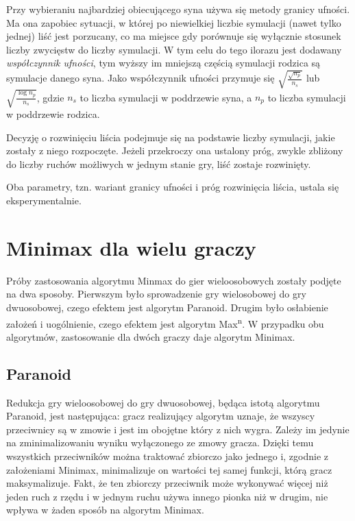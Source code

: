 \documentclass{pracamgr}
\begin{document}
Przy wybieraniu najbardziej obiecującego syna używa się metody granicy ufności.
Ma ona zapobiec sytuacji, w której po niewielkiej liczbie symulacji (nawet tylko jednej) liść jest porzucany, co ma miejsce gdy porównuje się wyłącznie stosunek liczby zwycięstw do liczby symulacji.
W tym celu do tego ilorazu jest dodawany \emph{współczynnik ufności}, tym wyższy im mniejszą częścią symulacji rodzica są symulacje danego syna. Jako współczynnik ufności przymuje się \(\sqrt{\frac{\sqrt{n_p}}{n_s}}\) lub \(\sqrt{\frac{\log{n_p}}{n_s}}\), gdzie \(n_s\) to liczba symulacji w poddrzewie syna, a \(n_p\) to liczba symulacji w poddrzewie rodzica.

Decyzję o rozwinięciu liścia podejmuje się na podstawie liczby symulacji, jakie zostały z niego rozpoczęte.
Jeżeli przekroczy ona ustalony próg, zwykle zbliżony do liczby ruchów możliwych w jednym stanie gry, liść zostaje rozwinięty.

Oba parametry, tzn. wariant granicy ufności i próg rozwinięcia liścia, ustala się eksperymentalnie.

\section{Minimax dla wielu graczy}

Próby zastosowania algorytmu Minmax do gier wieloosobowych zostały podjęte na dwa sposoby.
Pierwszym było sprowadzenie gry wielosobowej do gry dwuosobowej, czego efektem jest algorytm Paranoid.
Drugim było osłabienie założeń i uogólnienie, czego efektem jest algorytm Max\textsuperscript{n}.
W przypadku obu algorytmów, zastosowanie dla dwóch graczy daje algorytm Minimax.

\subsection{Paranoid}

Redukcja gry wieloosobowej do gry dwuosobowej, będąca istotą algorytmu Paranoid, jest następująca: gracz realizujący algorytm uznaje, że wszyscy przeciwnicy są w zmowie i jest im obojętne który z nich wygra.
Zależy im jedynie na zminimalizowaniu wyniku wyłączonego ze zmowy gracza.
Dzięki temu wszystkich przeciwników można traktować zbiorczo jako jednego i, zgodnie z założeniami Minimax, minimalizuje on wartości tej samej funkcji, którą gracz maksymalizuje.
Fakt, że ten zbiorczy przeciwnik może wykonywać więcej niż jeden ruch z rzędu i w jednym ruchu używa innego pionka niż w drugim, nie wpływa w żaden sposób na algorytm Minimax.
\end{document}
